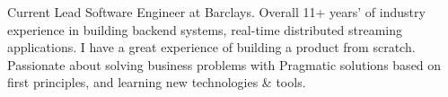 

\begin{cvparagraph}

Current Lead Software Engineer at Barclays. Overall 11+ years' of industry experience in building backend systems, real-time distributed streaming applications. I have a great experience of building a product from scratch. Passionate about solving business problems with Pragmatic solutions based on first principles, and learning new technologies \& tools.
\end{cvparagraph}
